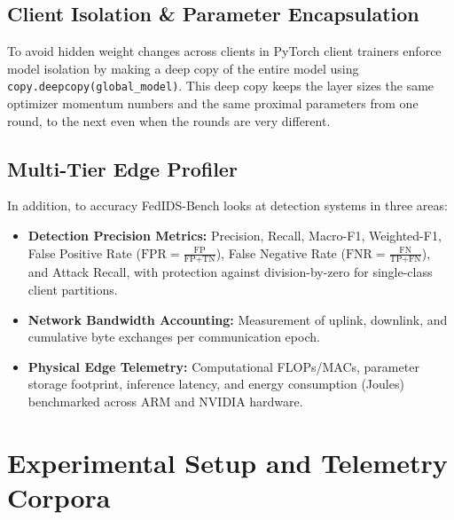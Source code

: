 \documentclass[conference]{IEEEtran}
\begin{document}
\subsection{Client Isolation \& Parameter Encapsulation}
To avoid hidden weight changes across clients in PyTorch client trainers enforce model isolation by making a deep copy of the entire model using \texttt{copy.deepcopy(global\_model)}. This deep copy keeps the layer sizes the same optimizer momentum numbers and the same proximal parameters from one round, to the next even when the rounds are very different.

\subsection{Multi-Tier Edge Profiler}
In addition, to accuracy FedIDS-Bench looks at detection systems in three areas:
\begin{itemize}
    \item \textbf{Detection Precision Metrics:} Precision, Recall, Macro-F1, Weighted-F1, False Positive Rate ($\text{FPR} = \frac{\text{FP}}{\text{FP} + \text{TN}}$), False Negative Rate ($\text{FNR} = \frac{\text{FN}}{\text{TP} + \text{FN}}$), and Attack Recall, with protection against division-by-zero for single-class client partitions.
    \item \textbf{Network Bandwidth Accounting:} Measurement of uplink, downlink, and cumulative byte exchanges per communication epoch.
    \item \textbf{Physical Edge Telemetry:} Computational FLOPs/MACs, parameter storage footprint, inference latency, and energy consumption (Joules) benchmarked across ARM and NVIDIA hardware.
\end{itemize}

\section{Experimental Setup and Telemetry Corpora}
\label{sec:methodology}
\end{document}
